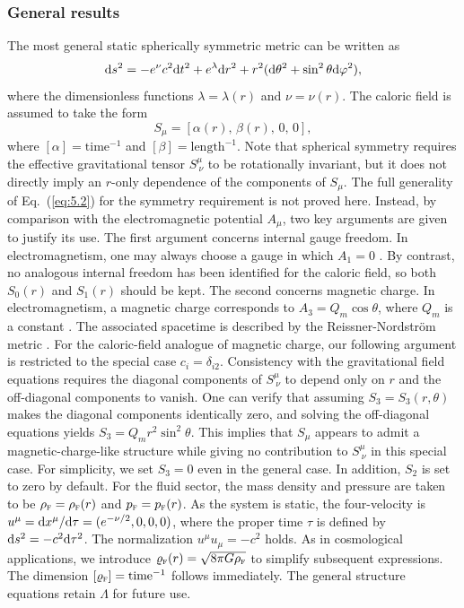 \documentclass[aps,prd,twocolumn]{revtex4-2}
\newcommand\dx{{\rm d}}
\newcommand\subF{\textsc{f}}
\begin{document}
\subsubsection{General results}
The most general static spherically symmetric metric can be written as \cite{Tolman1939.PhysRev.55.364,Oppenheimer1939.PhysRev.55.374}
\begin{equation}\label{eq:5.1}
  \dx s^2=-e^\nu c^2\dx t^2+e^\lambda\dx r^2+r^2(\dx\theta^2+\sin^2\theta\dx\varphi^2),
\end{equation}
where the dimensionless functions $\lambda=\lambda(r)$ and $\nu=\nu(r)$. The caloric field is assumed to take the form
\begin{equation}\label{eq:5.2}
  S_\mu=[\alpha(r),\,\beta(r),\,0,\,0],
\end{equation}
where $[\alpha]=\mathrm{time}^{-1}$ and $[\beta]=\mathrm{length}^{-1}$. Note that spherical symmetry requires the effective gravitational tensor $S^\mu_{\ \nu}$ to be rotationally invariant, but it does not directly imply an $r$-only dependence of the components of $S_\mu$. The full generality of Eq.~(\ref{eq:5.2}) for the symmetry requirement is not proved here. Instead, by comparison with the electromagnetic potential $A_\mu$, two key arguments are given to justify its use. The first argument concerns internal gauge freedom. In electromagnetism, one may always choose a gauge in which $A_1=0$ \cite{Pellicer1969.JMathPhysNY.10.1718}. By contrast, no analogous internal freedom has been identified for the caloric field, so both $S_0(r)$ and $S_1(r)$ should be kept. The second concerns magnetic charge. In electromagnetism, a magnetic charge corresponds to $A_3=Q_m\cos\theta$, where $Q_m$ is a constant \cite{Fan2016.PRD.94.124027}. The associated spacetime is described by the Reissner-Nordstr{\"o}m metric \cite{Reissner1916.NotEngJ.355.106,Nordstrom1918.ProcKNAW.20.1238}. For the caloric-field analogue of magnetic charge, our following argument is restricted to the special case $c_i=\delta_{i2}$. Consistency with the gravitational field equations requires the diagonal components of $S^\mu_{\ \nu}$ to depend only on $r$ and the off-diagonal components to vanish. One can verify that assuming $S_3=S_3(r,\theta)$ makes the diagonal components identically zero, and solving the off-diagonal equations yields $S_3=Q_mr^2\sin^2\theta$. This implies that $S_\mu$ appears to admit a magnetic-charge-like structure while giving no contribution to $S^\mu_{\ \nu}$ in this special case. For simplicity, we set $S_3=0$ even in the general case. In addition, $S_2$ is set to zero by default. For the fluid sector, the mass density and pressure are taken to be $\rho_\subF=\rho_\subF(r)$ and $p_\subF=p_\subF(r)$. As the system is static, the four-velocity is $u^\mu=\dx x^\mu/\dx\tau=(e^{-\nu/2},0,0,0)$, where the proper time $\tau$ is defined by $\dx s^2=-c^2\dx\tau^2$. The normalization $u^\mu u_\mu=-c^2$ holds. As in cosmological applications, we introduce $\varrho_\subF(r)=\sqrt{8\pi G\rho_\subF}$ to simplify subsequent expressions. The dimension $[\varrho_\subF]=\mathrm{time}^{-1}$ follows immediately. The general structure equations retain $\Lambda$ for future use.
\end{document}
